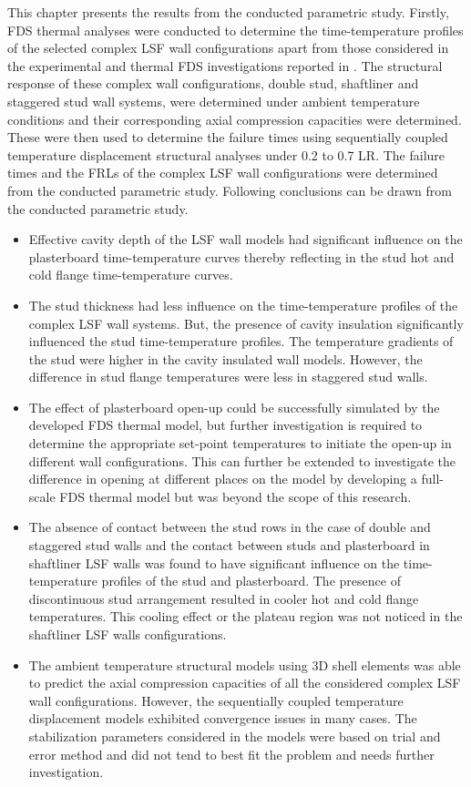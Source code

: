 This chapter presents the results from the conducted parametric study. Firstly, FDS thermal analyses were conducted to determine the time-temperature profiles of the selected complex LSF  wall configurations apart from those considered in the experimental and thermal FDS investigations reported in . The structural response of these complex wall configurations, double stud, shaftliner and staggered stud wall systems, were determined under ambient temperature conditions and their corresponding axial compression capacities were determined. These were then used to determine the failure times using sequentially coupled temperature displacement structural analyses under 0.2 to 0.7 LR. The failure times and the FRLs of the complex LSF wall configurations were determined from the conducted parametric study. Following conclusions can be drawn from the conducted parametric study.
\begin{itemize}
	\item Effective cavity depth of the LSF wall models had significant influence on the plasterboard time-temperature curves thereby reflecting in the stud hot and cold flange time-temperature curves.
	\item The stud thickness had less influence on the time-temperature profiles of the complex LSF wall systems. But, the presence of cavity insulation significantly influenced the stud time-temperature profiles. The temperature gradients of the stud were higher in the cavity insulated wall models. However, the difference in stud flange temperatures were less in staggered stud walls.
	\item The effect of plasterboard open-up could be successfully simulated by the developed FDS thermal model, but further investigation is required to determine the appropriate set-point temperatures to initiate the open-up in different wall configurations. This can further be extended to investigate the difference in opening at different places on the model by developing a full-scale FDS thermal model but was beyond the scope of this research. 
	\item The absence of contact between the stud rows in the case of double and staggered stud walls and the contact between studs and plasterboard in shaftliner LSF walls was found to have significant influence on the time-temperature profiles of the stud and plasterboard. The presence of discontinuous stud arrangement resulted in cooler hot and cold flange temperatures. This cooling effect or the plateau region was not noticed in the shaftliner LSF walls configurations.
	\item The ambient temperature structural models using 3D shell elements was able to predict the axial compression capacities of all the considered complex LSF wall configurations. However, the sequentially coupled temperature displacement models exhibited convergence issues in many cases. The stabilization parameters considered in the models were based on trial and error method and did not tend to best fit the problem and needs further investigation. 
\end{itemize}

